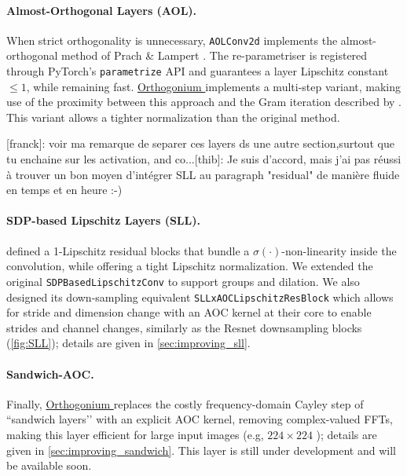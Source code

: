 \documentclass[10pt]{article}
\theoremstyle{plain}
\theoremstyle{definition}
\theoremstyle{remark}
\newcommand{\thib}[1]{{\color{blue}[thib]: #1}}
\newcommand{\franck}[1]{{\color{red}[franck]: #1}}
\newcommand{\thib}[1]{}
\newcommand{\franck}[1]{}
\newcommand{\Orthogonium}{ \href{https://github.com/deel-ai/orthogonium/}{Orthogonium }}
\begin{document}
    \paragraph{Almost-Orthogonal Layers (AOL).}
    When strict orthogonality is unnecessary, \verb|AOLConv2d| implements the almost-orthogonal method of Prach \& Lampert \cite{prach_almost-orthogonal_2022}.  The
    re-parametriser is registered through PyTorch’s
    \verb|parametrize| API and guarantees a layer Lipschitz constant
    \(\le1\), while remaining fast. \Orthogonium 
    implements a multi-step variant, making use of the proximity between this approach and the Gram 
    iteration described by \cite{delattre2024spectral}. This variant allows a tighter normalization than the original method.
    
    \franck{voir ma remarque de separer ces layers ds une autre section,surtout que tu enchaine sur les activation, and co...}\thib{Je suis d'accord, mais j'ai pas réussi à trouver un bon moyen d'intégrer SLL au paragraph "residual" de manière fluide en temps et en heure :-)}
    
    \paragraph{SDP-based Lipschitz Layers (SLL).}
    \cite{araujo_unified_2023} defined a 1-Lipschitz residual blocks that bundle a
    \(\sigma(\cdot)\)-non-linearity inside the convolution, while offering a tight Lipschitz normalization. We extended the original
    \verb|SDPBasedLipschitzConv| to support groups and dilation. We also designed its down-sampling equivalent
    \verb|SLLxAOCLipschitzResBlock| which allows for stride and dimension change with an AOC kernel at their core to enable strides and channel changes, similarly as the Resnet downsampling blocks (\cref{fig:SLL}); details are given in
    \cref{sec:improving_sll}.
    
    \paragraph{Sandwich-AOC.}
    Finally, \Orthogonium replaces the costly frequency-domain Cayley step of
    “sandwich layers’’ \cite{wang_direct_2023} with an explicit
    AOC kernel, removing complex-valued FFTs, making this layer efficient for large input images (e.g, $224 \times 224 $ ); details are given in
    \cref{sec:improving_sandwich}. This layer is still under development and will be available soon.
\end{document}
